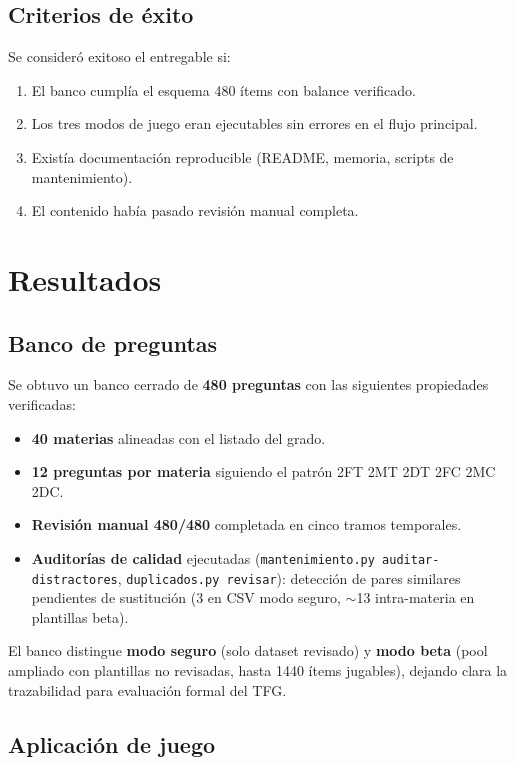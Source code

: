 \documentclass[11pt,a4paper]{article}
\begin{document}
\subsection{Criterios de éxito}

Se consideró exitoso el entregable si:
\begin{enumerate}
  \item El banco cumplía el esquema 480 ítems con balance verificado.
  \item Los tres modos de juego eran ejecutables sin errores en el flujo principal.
  \item Existía documentación reproducible (README, memoria, scripts de mantenimiento).
  \item El contenido había pasado revisión manual completa.
\end{enumerate}

\section{Resultados}

\subsection{Banco de preguntas}

Se obtuvo un banco cerrado de \textbf{480 preguntas} con las siguientes propiedades verificadas:
\begin{itemize}
  \item \textbf{40 materias} alineadas con el listado del grado.
  \item \textbf{12 preguntas por materia} siguiendo el patrón 2FT 2MT 2DT 2FC 2MC 2DC.
  \item \textbf{Revisión manual 480/480} completada en cinco tramos temporales.
  \item \textbf{Auditorías de calidad} ejecutadas (\texttt{mantenimiento.py auditar-distractores}, \texttt{duplicados.py revisar}): detección de pares similares pendientes de sustitución (3 en CSV modo seguro, $\sim$13 intra-materia en plantillas beta).
\end{itemize}

El banco distingue \textbf{modo seguro} (solo dataset revisado) y \textbf{modo beta} (pool ampliado con plantillas no revisadas, hasta 1440 ítems jugables), dejando clara la trazabilidad para evaluación formal del TFG.

\subsection{Aplicación de juego}
\end{document}

